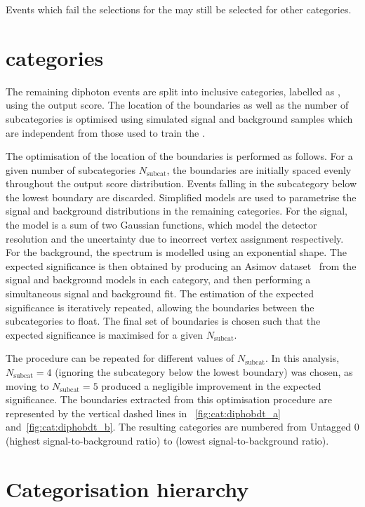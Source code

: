 Events which fail the selections for the \TTHTag\s may still be selected for other categories.

\section{\Untagged categories}
\label{cat:sec:untagged}

The remaining diphoton events are split into inclusive categories, labelled as \Untagged, using the \DiPhoBdt output score. The location of the boundaries as well as the number of subcategories is optimised using simulated signal and background samples which are independent from those used to train the \DiPhoBdt. 

The optimisation of the location of the boundaries is performed as follows. For a given number of subcategories $N_\text{subcat}$, the boundaries are initially spaced evenly throughout the \DiPhoBdt output score distribution. Events falling in the subcategory below the lowest boundary are discarded. Simplified models are used to parametrise the signal and background \mgg distributions in the remaining categories. For the signal, the model is a sum of two Gaussian functions, which model the detector resolution and the uncertainty due to incorrect vertex assignment respectively. For the background, the \mgg spectrum is modelled using an exponential shape. The expected significance is then obtained by producing an Asimov dataset~\cite{Cowan:2010js} from the signal and background models in each category, and then performing a simultaneous signal and background fit. The estimation of the expected significance is iteratively repeated, allowing the boundaries between the subcategories to float. The final set of boundaries is chosen such that the expected significance is maximised for a given $N_\text{subcat}$.

The procedure can be repeated for different values of $N_\text{subcat}$. In this analysis, $N_\text{subcat}=4$ (ignoring the subcategory below the lowest boundary) was chosen, as moving to $N_\text{subcat}=5$ produced a negligible improvement in the expected significance. The boundaries extracted from this optimisation procedure are represented by the vertical dashed lines in \Fig\s~\ref{fig:cat:diphobdt_a} and~\ref{fig:cat:diphobdt_b}. The resulting \Untagged categories are numbered from Untagged 0 (highest signal-to-background ratio) to  (lowest signal-to-background ratio).

\section{Categorisation hierarchy}
\label{cat:sec:hierarchy}

